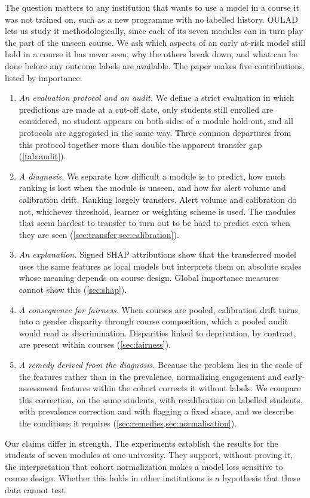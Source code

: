 \documentclass[journal]{IEEEtran}
\begin{document}
The question matters to any institution that wants to use a model in a course it was not trained on, such as a new programme with no labelled history. OULAD lets us study it methodologically, since each of its seven modules can in turn play the part of the unseen course. We ask which aspects of an early at-risk model still hold in a course it has never seen, why the others break down, and what can be done before any outcome labels are available. The paper makes five contributions, listed by importance.
\begin{enumerate}
\item \emph{An evaluation protocol and an audit.} We define a strict evaluation in which predictions are made at a cut-off date, only students still enrolled are considered, no student appears on both sides of a module hold-out, and all protocols are aggregated in the same way. Three common departures from this protocol together more than double the apparent transfer gap (\cref{tab:audit}).
\item \emph{A diagnosis.} We separate how difficult a module is to predict, how much ranking is lost when the module is unseen, and how far alert volume and calibration drift. Ranking largely transfers. Alert volume and calibration do not, whichever threshold, learner or weighting scheme is used. The modules that seem hardest to transfer to turn out to be hard to predict even when they are seen (\cref{sec:transfer,sec:calibration}).
\item \emph{An explanation.} Signed SHAP attributions show that the transferred model uses the same features as local models but interprets them on absolute scales whose meaning depends on course design. Global importance measures cannot show this (\cref{sec:shap}).
\item \emph{A consequence for fairness.} When courses are pooled, calibration drift turns into a gender disparity through course composition, which a pooled audit would read as discrimination. Disparities linked to deprivation, by contrast, are present within courses (\cref{sec:fairness}).
\item \emph{A remedy derived from the diagnosis.} Because the problem lies in the scale of the features rather than in the prevalence, normalizing engagement and early-assessment features within the cohort corrects it without labels. We compare this correction, on the same students, with recalibration on labelled students, with prevalence correction and with flagging a fixed share, and we describe the conditions it requires (\cref{sec:remedies,sec:normalisation}).
\end{enumerate}
Our claims differ in strength. The experiments establish the results for the students of seven modules at one university. They support, without proving it, the interpretation that cohort normalization makes a model less sensitive to course design. Whether this holds in other institutions is a hypothesis that these data cannot test.
\end{document}
